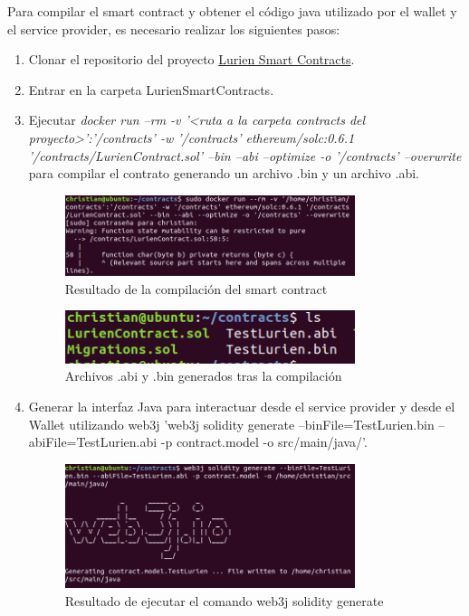 \documentclass[12pt]{report}
\begin{document}
Para compilar el smart contract y obtener el código java utilizado por el wallet y el service provider, es necesario realizar los siguientes pasos:
\begin{enumerate}
\item Clonar el repositorio del proyecto \href{https://github.com/ChristianTaidi/LurienSmartContracts}{Lurien Smart Contracts}.
\item Entrar en la carpeta LurienSmartContracts.
\item Ejecutar \textit{docker run --rm -v '<ruta a la carpeta contracts del proyecto>':'/contracts' -w '/contracts' ethereum/solc:0.6.1 '/contracts/LurienContract.sol' --bin --abi --optimize -o '/contracts' --overwrite} para compilar el contrato generando un archivo .bin y un archivo .abi. 

\begin{figure}[H]
\includegraphics[width=0.8\textwidth]{smart-contract-compile}
\caption{Resultado de la compilación del smart contract}
\end{figure}

\begin{figure}[H]
\includegraphics[width=0.8\textwidth]{compiled-contracts}
\caption{Archivos .abi y .bin generados tras la compilación}
\end{figure}
\item Generar la interfaz Java para interactuar desde el service provider y desde el Wallet utilizando web3j 'web3j solidity generate --binFile=TestLurien.bin --abiFile=TestLurien.abi -p contract.model -o src/main/java/'.

\begin{figure}[H]
\includegraphics[width=0.8\textwidth]{smartcontract-java}
\caption{Resultado de ejecutar el comando web3j solidity generate}
\end{figure}


\end{enumerate}
\end{document}
